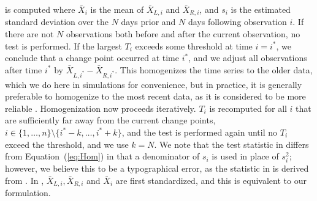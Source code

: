 \documentclass[12pt]{article}
\def\ni{\noindent}
\begin{document}
\begin{doublespacing}
\ni is computed where $\bar{X}_i$ is the mean of $\bar{X}_{L,i}$ and $\bar{X}_{R,i}$, and $s_i$ is the estimated standard deviation over the $N$ days prior and $N$ days following observation $i$.  If there are not $N$ observations both before and after the current observation, no test is performed.  If the largest $T_i$ exceeds some threshold at time $i=i^*$, we conclude that a change point occurred at time $i^*$, and we adjust all observations after time $i^*$ by $\bar{X}_{L,i^*}-\bar{X}_{R,i^*}$. This homogenizes the time series to the older data, which we do here in simulations for convenience, but  in practice, it is generally preferable to homogenize to the most recent data, as it is considered to be more reliable \cite{domonkos13}. %
 Homogenization now proceeds iteratively.  $T_i$ is recomputed for all $i$ that are sufficiently far away from the current change points, $i\in\{1,\ldots,n\} \setminus \{i^*-k, \ldots, i^*+k\}$, and the test is performed again until no $T_i$ exceed the threshold, and we use $k=N$.  
We note that the test statistic in \cite{haimberger07} differs from Equation~(\ref{eq:Hom}) in that a denominator of $s_i$ is used in place of $s_i^2$; however, we believe this to be a typographical error, as the statistic in \cite{haimberger07} is derived from \cite{alexandersson86}.  In \cite{alexandersson86}, $\bar{X}_{L,i}, \bar{X}_{R,i}$ and $\bar{X}_{i}$ are first standardized, and  this is equivalent to our formulation.



\end{doublespacing}
\end{document}
